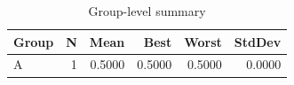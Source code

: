 \begin{table}[htbp]
\centering
\caption{Group-level summary}
\label{tab:group-summary}
\begin{tabular}{lrrrrr}
\toprule
\textbf{Group} & \textbf{N} & \textbf{Mean} & \textbf{Best} & \textbf{Worst} & \textbf{StdDev} \\
\midrule
A & 1 & 0.5000 & 0.5000 & 0.5000 & 0.0000 \\
\bottomrule
\end{tabular}
\end{table}